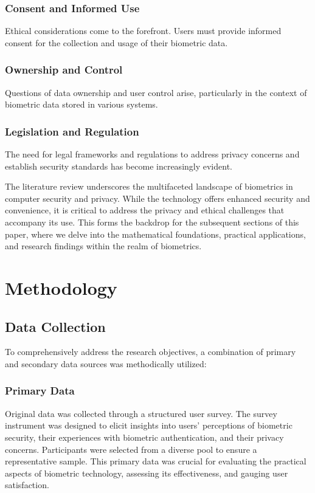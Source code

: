 \documentclass{IEEEtran}
\begin{document}
\subsubsection{Consent and Informed Use}
Ethical considerations come to the forefront. Users must provide informed consent for the collection and usage of their biometric data.

\subsubsection{Ownership and Control}
Questions of data ownership and user control arise, particularly in the context of biometric data stored in various systems.

\subsubsection{Legislation and Regulation}
The need for legal frameworks and regulations to address privacy concerns and establish security standards has become increasingly evident.

The literature review underscores the multifaceted landscape of biometrics in computer security and privacy. While the technology offers enhanced security and convenience, it is critical to address the privacy and ethical challenges that accompany its use. This forms the backdrop for the subsequent sections of this paper, where we delve into the mathematical foundations, practical applications, and research findings within the realm of biometrics.

\section{Methodology}
\subsection{Data Collection}
To comprehensively address the research objectives, a combination of primary and secondary data sources was methodically utilized:

\subsubsection{Primary Data}
Original data was collected through a structured user survey. The survey instrument was designed to elicit insights into users' perceptions of biometric security, their experiences with biometric authentication, and their privacy concerns. Participants were selected from a diverse pool to ensure a representative sample. This primary data was crucial for evaluating the practical aspects of biometric technology, assessing its effectiveness, and gauging user satisfaction.
\end{document}
